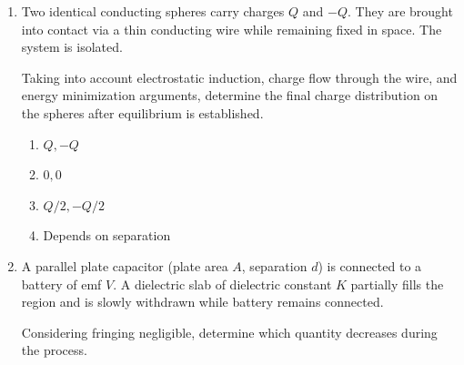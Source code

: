 \documentclass[12pt]{article}
\begin{document}
\begin{enumerate}
\begin{center}
\end{center}

\begin{enumerate}[label=\Alph*)]
\item $\dfrac{1}{4\pi\epsilon_0}\dfrac{Qx}{(R^2+x^2)^{3/2}}$, maximum at $x = \dfrac{R}{\sqrt{2}}$
\item $\dfrac{1}{4\pi\epsilon_0}\dfrac{Q}{R^2+x^2}$, maximum at $x = R$
\item $\dfrac{1}{4\pi\epsilon_0}\dfrac{Qx}{(R^2+x^2)^{3/2}}$, maximum at $x = R$
\item $\dfrac{1}{4\pi\epsilon_0}\dfrac{Q}{x^2}$, maximum at $x \to 0$
\end{enumerate}

\item Two identical conducting spheres carry charges $Q$ and $-Q$. They are brought into contact via a thin conducting wire while remaining fixed in space. The system is isolated.

Taking into account electrostatic induction, charge flow through the wire, and energy minimization arguments, determine the final charge distribution on the spheres after equilibrium is established.

\begin{enumerate}[label=\Alph*)]
\item $Q, -Q$
\item $0, 0$
\item $Q/2, -Q/2$
\item Depends on separation
\end{enumerate}

\item A parallel plate capacitor (plate area $A$, separation $d$) is connected to a battery of emf $V$. A dielectric slab of dielectric constant $K$ partially fills the region and is slowly withdrawn while battery remains connected.

Considering fringing negligible, determine which quantity decreases during the process.


\end{enumerate}
\end{document}
